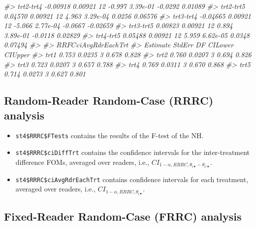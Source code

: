 \documentclass[
]{book}
\newenvironment{Shaded}{\begin{snugshade}}{\end{snugshade}}
\newcommand{\CommentTok}[1]{\textcolor[rgb]{0.56,0.35,0.01}{\textit{#1}}}
\begin{document}
\begin{Shaded}
\begin{Highlighting}[]
\CommentTok{\#\textgreater{} trt2{-}trt4 {-}0.00918 0.00921 12 {-}0.997 3.39e{-}01 {-}0.0292  0.01089}
\CommentTok{\#\textgreater{} trt2{-}trt5  0.04570 0.00921 12  4.963 3.29e{-}04  0.0256  0.06576}
\CommentTok{\#\textgreater{} trt3{-}trt4 {-}0.04665 0.00921 12 {-}5.066 2.77e{-}04 {-}0.0667 {-}0.02659}
\CommentTok{\#\textgreater{} trt3{-}trt5  0.00823 0.00921 12  0.894 3.89e{-}01 {-}0.0118  0.02829}
\CommentTok{\#\textgreater{} trt4{-}trt5  0.05488 0.00921 12  5.959 6.62e{-}05  0.0348  0.07494}
\CommentTok{\#\textgreater{} }
\CommentTok{\#\textgreater{} $RRFC$ciAvgRdrEachTrt}
\CommentTok{\#\textgreater{}      Estimate StdErr DF CILower CIUpper}
\CommentTok{\#\textgreater{} trt1    0.753 0.0235  3   0.678   0.828}
\CommentTok{\#\textgreater{} trt2    0.760 0.0207  3   0.694   0.826}
\CommentTok{\#\textgreater{} trt3    0.723 0.0207  3   0.657   0.788}
\CommentTok{\#\textgreater{} trt4    0.769 0.0311  3   0.670   0.868}
\CommentTok{\#\textgreater{} trt5    0.714 0.0273  3   0.627   0.801}
\end{Highlighting}
\end{Shaded}

\hypertarget{ORApplications-RRRC-dataset04-FROC-DBM}{%
\subsection{Random-Reader Random-Case (RRRC) analysis}\label{ORApplications-RRRC-dataset04-FROC-DBM}}

\begin{itemize}
\item
  \texttt{st4\$RRRC\$FTests} contains the results of the F-test of the NH.
\item
  \texttt{st4\$RRRC\$ciDiffTrt} contains the confidence intervals for the inter-treatment difference FOMs, averaged over readers, i.e., \(CI_{1-\alpha,RRRC,\theta_{i \bullet} - \theta_{i' \bullet}}\).
\item
  \texttt{st4\$RRRC\$ciAvgRdrEachTrt} contains confidence intervals for each treatment, averaged over readers, i.e., \(CI_{1-\alpha,RRRC,\theta_{i \bullet}}\).
\end{itemize}

\hypertarget{ORApplications-FRRC-dataset04-FROC-DBM}{%
\subsection{Fixed-Reader Random-Case (FRRC) analysis}\label{ORApplications-FRRC-dataset04-FROC-DBM}}
\end{document}
